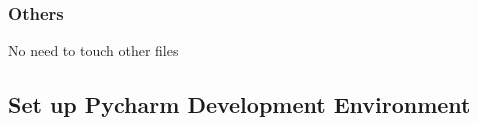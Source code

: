\documentclass[11pt]{article}
\begin{document}
\subsubsection{Others}
\label{sec:orgfe03291}

No need to touch other files

\subsection{Set up Pycharm Development Environment}
\label{sec:org8085958}
\end{document}
